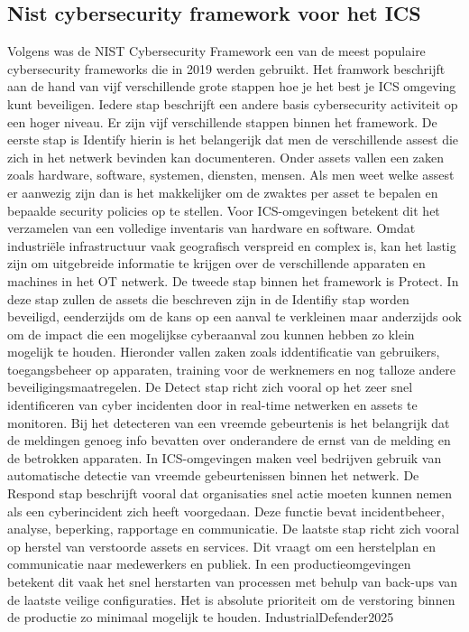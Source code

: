 \subsection{Nist cybersecurity framework voor het ICS}
Volgens \textcite{IndustrialDefender2025} was de NIST Cybersecurity Framework een van de meest populaire cybersecurity frameworks die in 2019 werden gebruikt. Het framwork beschrijft aan de hand van vijf verschillende grote stappen hoe je het best je ICS omgeving kunt beveiligen. Iedere stap beschrijft een andere basis cybersecurity activiteit op een hoger niveau.
Er zijn vijf verschillende stappen binnen het framework. De eerste stap is Identify hierin is het belangerijk dat men de verschillende assest die zich in het netwerk bevinden kan documenteren. Onder assets vallen een zaken zoals hardware, software, systemen, diensten, mensen. Als men weet welke assest er aanwezig zijn dan is het makkelijker om de zwaktes per asset te bepalen en bepaalde security policies op te stellen. Voor ICS-omgevingen betekent dit het verzamelen van een volledige inventaris van hardware en software. Omdat industriële infrastructuur vaak geografisch verspreid en complex is, kan het lastig zijn om uitgebreide informatie te krijgen over de verschillende apparaten en machines in het OT netwerk. \autocite{Nist2024}
De tweede stap binnen het framework is Protect. In deze stap zullen de assets die beschreven zijn in de Identifiy stap worden beveiligd, eenderzijds om de kans op een aanval te verkleinen maar anderzijds ook om de impact die een mogelijkse cyberaanval zou kunnen hebben zo klein mogelijk te houden. Hieronder vallen zaken zoals iddentificatie van gebruikers, toegangsbeheer op apparaten, training voor de werknemers en nog talloze andere beveiligingsmaatregelen. \autocite{Nist2024}
De Detect stap richt zich vooral op het zeer snel identificeren van cyber incidenten door in real-time netwerken en assets te monitoren. Bij het detecteren van een vreemde gebeurtenis is het belangrijk dat de meldingen genoeg info bevatten over onderandere de ernst van de melding en de betrokken apparaten. In ICS-omgevingen maken veel bedrijven gebruik van automatische detectie van vreemde gebeurtenissen binnen het netwerk. \autocite{Nist2024}
De Respond stap beschrijft vooral dat organisaties snel actie moeten kunnen nemen als een cyberincident zich heeft voorgedaan. Deze functie bevat incidentbeheer, analyse, beperking, rapportage en communicatie. \autocite{Nist2024}
De laatste stap richt zich vooral op herstel van verstoorde assets en services. Dit vraagt om een herstelplan en communicatie naar medewerkers en publiek. In een productieomgevingen betekent dit vaak het snel herstarten van processen met behulp van back-ups van de laatste veilige configuraties. Het is absolute prioriteit om de verstoring binnen de productie zo minimaal mogelijk te houden. {IndustrialDefender2025}


